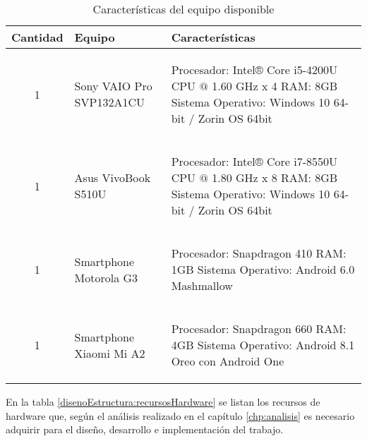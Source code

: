 \begin{table}[htbp]
	\begin{center}
		\begin{tabular}{|c|p{5cm}|p{7cm}|}
			\hline
			Cantidad&Equipo&Características\\
			\hline
			\hline
			1 & Sony VAIO Pro SVP132A1CU & \begin{UClist}
				\UCli Procesador: Intel® Core i5-4200U CPU $@$ 1.60 GHz x 4
				\UCli RAM: 8GB
				\UCli Sistema Operativo: Windows 10 64-bit / Zorin OS 64bit
				\end{UClist} \\
			\hline
			1 & Asus VivoBook S510U & \begin{UClist}
				\UCli Procesador: Intel® Core i7-8550U CPU $@$ 1.80 GHz x 8
				\UCli RAM: 8GB
				\UCli Sistema Operativo: Windows 10 64-bit / Zorin OS 64bit
			\end{UClist}\\
			\hline 
			1 & Smartphone Motorola G3 & \begin{UClist}
				\UCli Procesador: Snapdragon 410
				\UCli RAM: 1GB
				\UCli Sistema Operativo: Android 6.0 Mashmallow
			\end{UClist}\\
			\hline
			1 & Smartphone Xiaomi Mi A2 &\begin{UClist}
				\UCli Procesador: Snapdragon 660
				\UCli RAM: 4GB
				\UCli Sistema Operativo: Android 8.1 Oreo con Android One
			\end{UClist}\\
			\hline
		\end{tabular}
		\caption{Características del equipo disponible}
		\label{disenoEstructura:equipos}
	\end{center}
\end{table}

En la tabla \ref{disenoEstructura:recursosHardware} se listan los recursos de hardware que, según el análisis realizado en el capítulo \ref{chp:analisis} es necesario adquirir para el diseño, desarrollo e implementación del trabajo.\\


